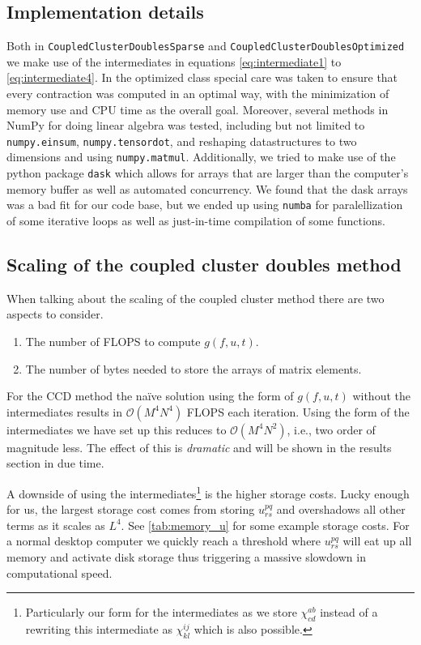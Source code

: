 \documentclass[
    a4paper, aps, twocolumn, floatfix, superscriptaddress,
    nofootinbib]{revtex4-1}
\newcommand{\1}{\mathds{1}}
\begin{document}
    \subsection{Implementation details}
        Both in \texttt{CoupledClusterDoublesSparse} and
        \texttt{CoupledClusterDoublesOptimized} we make use of the
        intermediates in equations \ref{eq:intermediate1} to
        \ref{eq:intermediate4}.  In the optimized class special care was taken
        to ensure that every contraction was computed in an optimal way, with
        the minimization of memory use and CPU time as the overall goal.
        Moreover, several methods in NumPy for doing linear algebra was tested,
        including but not limited to \texttt{numpy.einsum},
        \texttt{numpy.tensordot}, and reshaping datastructures to
        two dimensions and using \texttt{numpy.matmul}.
        Additionally, we tried to make use of the python package
        \texttt{dask} which allows for arrays that are larger than
        the computer's memory buffer as well as automated concurrency. We found
        that the dask arrays was a bad fit for our code base, but we ended up
        using \texttt{numba} for paralellization of some
        iterative loops as well as just-in-time compilation of some functions.

    \subsection{Scaling of the coupled cluster doubles method}
        When talking about the scaling of the coupled cluster method there are
        two aspects to consider.
        \begin{enumerate}
            \item The number of FLOPS to compute $g(f, u, t)$.
            \item The number of bytes needed to store the arrays of matrix
                elements.
        \end{enumerate}
        For the CCD method the naïve solution using the form of $g(f, u, t)$
        without the intermediates results in $\mathcal{O}(M^4N^4)$ FLOPS each
        iteration. Using the form of the intermediates we have set up this
        reduces to $\mathcal{O}(M^4N^2)$, i.e., two order of magnitude less. The
        effect of this is \emph{dramatic} and will be shown in the results
        section in due time.

        A downside of using the intermediates\footnote{Particularly our form for
        the intermediates as we store $\chi^{ab}_{cd}$ instead of a rewriting
        this intermediate as $\chi^{ij}_{kl}$ which is also possible.} is the
        higher storage costs. Lucky enough for us, the largest storage cost
        comes from storing $u^{pq}_{rs}$ and overshadows all other terms as it
        scales as $L^4$. See \autoref{tab:memory_u} for some example storage
        costs. For a normal desktop computer we quickly reach a threshold where
        $u^{pq}_{rs}$ will eat up all memory and activate disk storage thus
        triggering a massive slowdown in computational speed.
\end{document}
